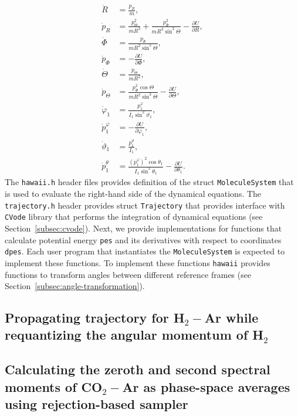 \documentclass[color]{article}
\newcommand{\lb}{\left(}
\newcommand{\rb}{\right)}
\begin{document}
\begin{align*}
    \dot{R} &= \frac{p_R}{m}, \\
    \dot{p}_R &= \frac{p_\Theta^2}{m R^3} + \frac{p_\Phi^2}{m R^3 \sin^2 \Theta} - \frac{\partial U}{\partial R}, \\
    \dot{\Phi} &= \frac{p_\Phi}{m R^2 \sin^2 \Theta}, \\
    \dot{p}_\Phi &= -\frac{\partial U}{\partial \Phi}, \\
    \dot{\Theta} &= \frac{p_\Theta}{m R^2}, \\
    \dot{p}_\Theta &= \frac{p_\Phi^2 \cos \Theta}{m R^2 \sin^3 \Theta} - \frac{\partial U}{\partial \Theta}, \\
    \dot{\varphi}_1 &= \frac{\displaystyle p_1^{\varphi}}{I_1 \sin^2 \vartheta_1}, \\
    \dot{p}_1^{\varphi} &= -\frac{\partial U}{\partial \varphi_1}, \\
    \dot{\vartheta}_1 &= \frac{p_1^\vartheta}{I_1}, \\ 
    \dot{p}_1^{\theta} &= \frac{\displaystyle \lb p_1^\varphi \rb^2 \cos \theta_1}{I_1 \sin^3 \theta_1} - \frac{\partial U}{\partial \theta_1}.
\end{align*}
%
The \texttt{hawaii.h} header files provides definition of the struct \texttt{MoleculeSystem} that is used to evaluate the right-hand side of the dynamical equations. The \texttt{trajectory.h} header provides struct \texttt{Trajectory} that provides interface with \texttt{CVode} library that performs the integration of dynamical equations (see Section~\ref{subsec:cvode}).
Next, we provide implementations for functions that calculate potential energy \texttt{pes} and its derivatives with respect to coordinates \texttt{dpes}. Each user program that instantiates the \texttt{MoleculeSystem} is expected to implement these functions. To implement these functions \texttt{hawaii} provides functions to transform angles between different reference frames (see Section~\ref{subsec:angle-transformation}).      


\subsection{Propagating trajectory for H$_2-$Ar while requantizing the angular momentum of H$_2$}
\label{subsec:example-req-trajectory}

\subsection{Calculating the zeroth and second spectral moments of CO$_2-$Ar as phase-space averages using rejection-based sampler}
\label{subsec:example-spmoments-co2-ar}
\end{document}
